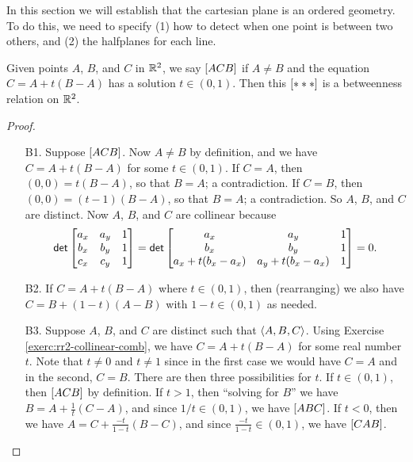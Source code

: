 In this section we will establish that the cartesian plane is an ordered geometry.
To do this, we need to specify (1) how to detect when one point is between two others, and (2) the halfplanes for each line.

\begin{prop}\label{prop:rr2-between}
Given points \(A\), \(B\), and \(C\) in \(\mathbb{R}^2\), we say \([ A C B ]\) if \(A \neq B\) and the equation \(C = A + t(B-A)\) has a solution \(t \in (0,1)\).
Then this \([ \ast \ast \ast ]\) is a betweenness relation on \(\mathbb{R}^2\).
\end{prop}

\begin{proof}\mbox{}
\begin{itemize}
\item[B1.] Suppose \([ A C B ]\).
Now \(A \neq B\) by definition, and we have \(C = A + t(B-A)\) for some \(t \in (0,1)\).
If \(C = A\), then \((0,0) = t(B-A)\), so that \(B = A\); a contradiction.
If \(C = B\), then \((0,0) = (t-1)(B-A)\), so that \(B = A\); a contradiction.
So \(A\), \(B\), and \(C\) are distinct.
Now \(A\), \(B\), and \(C\) are collinear because \[ \mathsf{det} \begin{bmatrix} a_x & a_y & 1 \\ b_x & b_y & 1 \\ c_x & c_y & 1 \end{bmatrix} = \mathsf{det} \begin{bmatrix} a_x & a_y & 1 \\ b_x & b_y & 1 \\ a_x + t(b_x-a_x) & a_y + t(b_x-a_x) & 1 \end{bmatrix} = 0. \]

\item[B2.] If \(C = A + t(B-A)\) where \(t \in (0,1)\), then (rearranging) we also have \(C = B + (1-t)(A-B)\) with \(1-t \in (0,1)\) as needed.

\item[B3.] Suppose \(A\), \(B\), and \(C\) are distinct such that \(\langle A, B, C \rangle\).
Using Exercise \ref{exerc:rr2-collinear-comb}, we have \(C = A + t(B-A)\) for some real number \(t\).
Note that \(t \neq 0\) and \(t \neq 1\) since in the first case we would have \(C = A\) and in the second, \(C = B\).
There are then three possibilities for \(t\).
If \(t \in (0,1)\), then \([ A C B ]\) by definition.
If \(t > 1\), then ``solving for \(B\)'' we have \(B = A + \frac{1}{t}(C-A)\), and since \(1/t \in (0,1)\), we have \([ A B C ]\).
If \(t < 0\), then we have \(A = C + \frac{-t}{1-t}(B-C)\), and since \(\frac{-t}{1-t} \in (0,1)\), we have \([ C A B ]\).


\end{itemize}
\end{proof}
